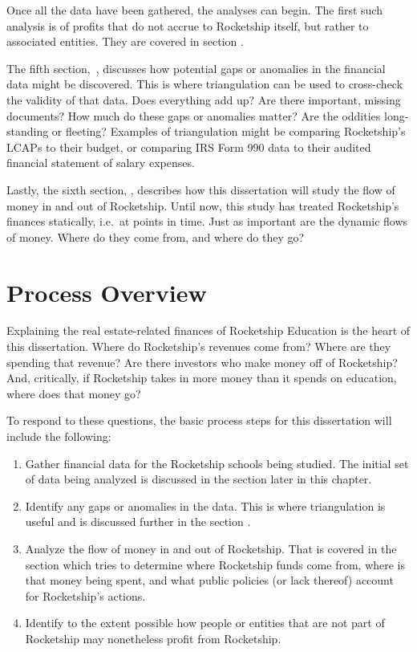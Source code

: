 Once all the data have been gathered, the analyses can begin.  The first such analysis is of profits that do not accrue to Rocketship itself, but rather to associated entities. They are covered in section \textit{}.

The fifth section,~\textit{}, discusses how potential gaps or anomalies in the financial data might be discovered. This is where triangulation can be used to cross-check the validity of that data. Does everything add up? Are there important, missing documents? How much do these gaps or anomalies matter? Are the oddities long-standing or fleeting? Examples of triangulation might be comparing Rocketship's LCAPs to their budget, or comparing IRS Form 990 data to their audited financial
statement of salary expenses.

Lastly, the sixth section, \textit{}, describes how this dissertation will study the flow of money in and out of Rocketship. Until now, this study has treated Rocketship's finances statically, i.e.~at points in time. Just as important are the dynamic flows of money. Where do they come from, and where do they go?

\section{Process Overview}\label{sec:process-overview}\indent

Explaining the real estate-related finances of Rocketship Education is the heart of this dissertation. Where do Rocketship's revenues come from? Where are they spending that revenue? Are there investors who make money off of Rocketship? And, critically, if Rocketship takes in more money than it spends on education, where does that money go?

To respond to these questions, the basic process steps for this dissertation will include the following:

\begin{enumerate}
  \item Gather financial data for the Rocketship schools being studied. The initial set of data being analyzed is discussed in the section \textit{} later in this chapter.
  \item Identify any gaps or anomalies in the data. This is where triangulation is useful and is discussed further in the section \textit{}. 
  \item Analyze the flow of money in and out of Rocketship. That  is covered in the section \textit{} which tries to determine where Rocketship funds come from, where is that money being spent, and what public policies (or lack thereof) account for Rocketship's actions.
  \item Identify to the extent possible how people or entities that are not part of Rocketship may nonetheless profit from Rocketship. 
\end{enumerate}


